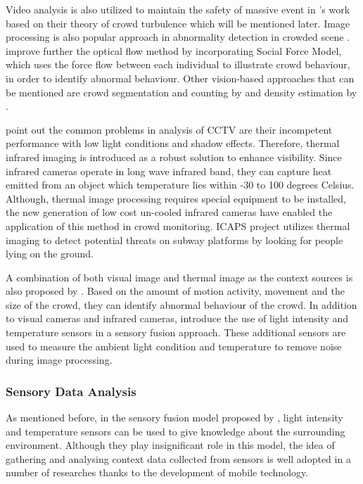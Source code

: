 Video analysis is also utilized to maintain the safety of massive event in \citet{Johansson2008}’s work based on their theory of crowd turbulence which will be mentioned later. Image processing is also popular approach in abnormality detection in crowded scene \citep{Mahadevan2010, Mehran2009}. \citet{Mehran2009} improve further the optical flow method by incorporating Social Force Model, which uses the force flow between each individual to illustrate crowd behaviour, in order to identify abnormal behaviour. Other vision-based approaches that can be mentioned are crowd segmentation and counting by \citet{Chan2008} and density estimation by \citet{Li2010}.

\citet{Andersson2009} point out the common problems in analysis of CCTV are their incompetent performance with low light conditions and shadow effects. Therefore, thermal infrared imaging is introduced as a robust solution to enhance visibility. Since infrared cameras operate in long wave infrared band, they can capture heat emitted from an object which temperature lies within -30 to 100 degrees Celsius. Although, thermal image processing requires special equipment to be installed, the new generation of low cost un-cooled infrared cameras have enabled the application of this method in crowd monitoring. ICAPS project \citep{Pham2007} utilizes thermal imaging to detect potential threats on subway platforms by looking for people lying on the ground.

A combination of both visual image and thermal image as the context sources is also proposed by \citet{Andersson2009}. Based on the amount of motion activity, movement and the size of the crowd, they can identify abnormal behaviour of the crowd. In addition to visual cameras and infrared cameras, \citet{Yaseen2013} introduce the use of light intensity and temperature sensors in a sensory fusion approach. These additional sensors are used to measure the ambient light condition and temperature to remove noise during image processing.

\subsubsection{Sensory Data Analysis}

As mentioned before, in the sensory fusion model proposed by \citet{Yaseen2013}, light intensity and temperature sensors can be used to give knowledge about the surrounding environment. Although they play insignificant role in this model, the idea of gathering and analysing context data collected from sensors is well adopted in a number of researches thanks to the development of mobile technology.

